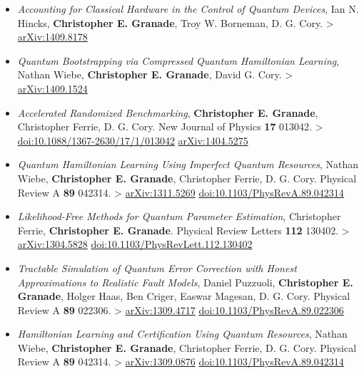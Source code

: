 \documentclass[]{article}
\begin{document}
\begin{itemize}
\item
  \emph{Accounting for Classical Hardware in the Control of Quantum
  Devices}, Ian N. Hincks, \textbf{Christopher E. Granade}, Troy W.
  Borneman, D. G. Cory. \textgreater{}
  \href{https://scirate.com/arxiv/1409.8178}{arXiv:1409.8178}
\item
  \emph{Quantum Bootstrapping via Compressed Quantum Hamiltonian
  Learning}, Nathan Wiebe, \textbf{Christopher E. Granade}, David G.
  Cory. \textgreater{}
  \href{https://scirate.com/arxiv/1409.1524}{arXiv:1409.1524}
\item
  \emph{Accelerated Randomized Benchmarking}, \textbf{Christopher E.
  Granade}, Christopher Ferrie, D. G. Cory. New Journal of Physics
  \textbf{17} 013042. \textgreater{}
  \href{http://dx.doi.org/10.1088/1367-2630/17/1/013042}{doi:10.1088/1367-2630/17/1/013042}
  \textbar{} \href{http://arxiv.org/abs/1404.5275}{arXiv:1404.5275}
\item
  \emph{Quantum Hamiltonian Learning Using Imperfect Quantum Resources},
  Nathan Wiebe, \textbf{Christopher E. Granade}, Christopher Ferrie, D.
  G. Cory. Physical Review A \textbf{89} 042314. \textgreater{}
  \href{http://arxiv.org/abs/1311.5269}{arXiv:1311.5269} \textbar{}
  \href{http://dx.doi.org/10.1103/PhysRevA.89.042314}{doi:10.1103/PhysRevA.89.042314}
\item
  \emph{Likelihood-Free Methods for Quantum Parameter Estimation},
  Christopher Ferrie, \textbf{Christopher E. Granade}. Physical Review
  Letters \textbf{112} 130402. \textgreater{}
  \href{http://arxiv.org/abs/1304.5828}{arXiv:1304.5828} \textbar{}
  \href{http://dx.doi.org/10.1103/PhysRevLett.112.130402}{doi:10.1103/PhysRevLett.112.130402}
\item
  \emph{Tractable Simulation of Quantum Error Correction with Honest
  Approximations to Realistic Fault Models}, Daniel Puzzuoli,
  \textbf{Christopher E. Granade}, Holger Haas, Ben Criger, Easwar
  Magesan, D. G. Cory. Physical Review A \textbf{89} 022306.
  \textgreater{} \href{http://arxiv.org/abs/1309.4717}{arXiv:1309.4717}
  \textbar{}
  \href{http://dx.doi.org/10.1103/PhysRevA.89.022306}{doi:10.1103/PhysRevA.89.022306}
\item
  \emph{Hamiltonian Learning and Certification Using Quantum Resources},
  Nathan Wiebe, \textbf{Christopher E. Granade}, Christopher Ferrie, D.
  G. Cory. Physical Review A \textbf{89} 042314. \textgreater{}
  \href{http://arxiv.org/abs/1309.0876}{arXiv:1309.0876} \textbar{}
  \href{http://dx.doi.org/10.1103/PhysRevA.89.042314}{doi:10.1103/PhysRevA.89.042314}
\end{itemize}
\end{document}
